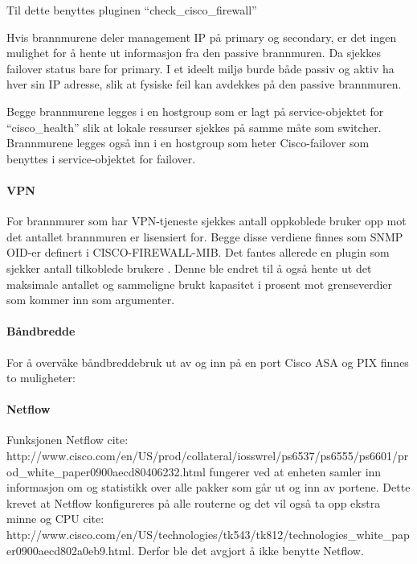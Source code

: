 Til dette benyttes pluginen “check\_cisco\_firewall” 

Hvis brannmurene deler management IP på primary og secondary, er det ingen mulighet for å hente ut informasjon fra den passive brannmuren. Da sjekkes failover status bare for primary. I et ideelt miljø burde både passiv og aktiv ha hver sin IP adresse, slik at fysiske feil kan avdekkes på den passive brannmuren.

Begge brannmurene legges i en hostgroup som er lagt på service-objektet for “cisco\_health” slik at lokale ressurser sjekkes på samme måte som switcher. Brannmurene legges også inn i en hostgroup som heter Cisco-failover som benyttes i service-objektet for failover.

\paragraph{VPN}

For brannmurer som har VPN-tjeneste sjekkes antall oppkoblede bruker opp mot det antallet brannmuren er lisensiert for. Begge disse verdiene finnes som SNMP OID-er definert i CISCO-FIREWALL-MIB. Det fantes allerede en plugin som sjekker antall tilkoblede brukere . Denne ble endret til å også hente ut det maksimale antallet og sammeligne brukt kapasitet i prosent mot grenseverdier som kommer inn som argumenter.

\paragraph{Båndbredde}

For å overvåke båndbreddebruk ut av og inn på en port Cisco ASA og PIX finnes to muligheter:

\paragraph{Netflow}

Funksjonen Netflow cite: http://www.cisco.com/en/US/prod/collateral/iosswrel/ps6537/ps6555/ps6601/prod\_white\_paper0900aecd80406232.html fungerer ved at enheten samler inn informasjon om og statistikk over alle pakker som går ut og inn av portene. Dette krevet at Netflow konfigureres på alle routerne og det vil også ta opp ekstra minne og CPU cite: http://www.cisco.com/en/US/technologies/tk543/tk812/technologies\_white\_paper0900aecd802a0eb9.html. Derfor ble det avgjort å ikke benytte Netflow.


